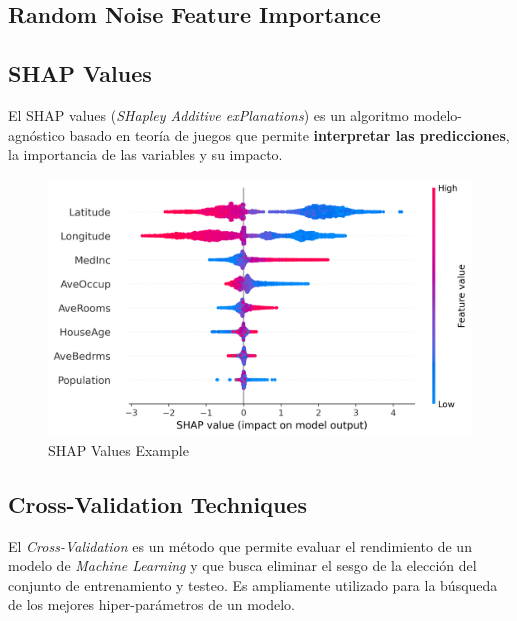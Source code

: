 \subsection{Random Noise Feature Importance}

\subsection{SHAP Values}
\label{subsec:shap_values}

El SHAP values (\textit{SHapley Additive exPlanations}) es un algoritmo modelo-agnóstico basado en teoría de juegos que permite \textbf{interpretar las predicciones}, la importancia de las variables y su impacto.

\begin{figure}[H]
    \center
    \includegraphics[scale=0.55]{notebooks/Others/img/shap_values_example.png}
    \caption{SHAP Values Example}
\end{figure}

\subsection{Cross-Validation Techniques}

El \textit{Cross-Validation} es un método que permite evaluar el rendimiento de un modelo de \textit{Machine Learning} y que busca eliminar el sesgo de la elección del conjunto de entrenamiento y testeo. Es ampliamente utilizado para la búsqueda de los mejores hiper-parámetros de un modelo. 


